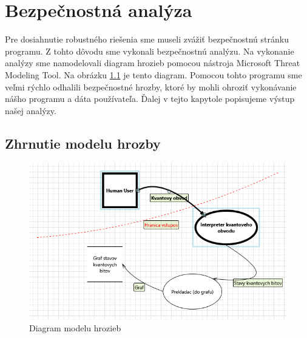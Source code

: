 
\chapter{Bezpečnostná analýza}


Pre dosiahnutie robustného riešenia sme museli zvážiť bezpečnostnú stránku programu.
Z tohto dôvodu sme vykonali bezpečnostnú analýzu.
Na vykonanie analýzy sme namodelovali diagram hrozieb pomocou nástroja Microsoft Threat Modeling Tool.
Na obrázku \ref{bez_di} je tento diagram.
Pomocou tohto programu sme veľmi rýchlo odhalili bezpečnostné hrozby, ktoré by mohli ohroziť vykonávanie nášho programu a dáta používateľa.
Ďalej v tejto kapytole popisujeme výstup našej analýzy.

\section{Zhrnutie modelu hrozby}

\begin{figure}[!t] 
	\centering 
	\includegraphics[width=.8\textwidth]{figures/diagram.png} 
	\caption{Diagram modelu hrozieb}
    \label{bez_di}
\end{figure}

